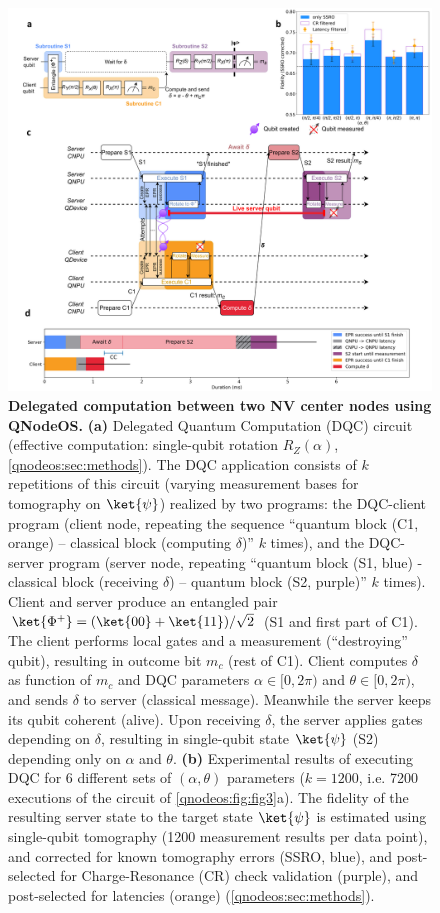 \begin{figure}[htbp]
\centering
\includegraphics[width=0.89\linewidth]{figures/qnodeos/main/fig3/fig3.png}
\caption{\textbf{Delegated computation between two NV center nodes using QNodeOS.} 
\textbf{(a)} Delegated Quantum Computation (DQC) circuit (effective computation: single-qubit rotation $R_Z (\alpha)$, \cref{qnodeos:sec:methods}). The DQC application consists of $k$ repetitions of this circuit (varying measurement bases for tomography on $\ket{\psi}$) realized by two programs: the DQC-client program (client node, repeating the sequence ``quantum block (C1, orange) – classical block (computing $\delta$)'' $k$ times), and the DQC-server program (server node, repeating ``quantum block (S1, blue) - classical block (receiving $\delta$) – quantum block (S2, purple)'' $k$ times). Client and server produce an entangled pair $\ket{\Phi^+} = (\ket{00} + \ket{11}) / \sqrt{2}$ (S1 and first part of C1). The client performs local gates and a measurement (``destroying'' qubit), resulting in outcome bit $m_c$ (rest of C1). Client computes $\delta$ as function of $m_c$ and DQC parameters $\alpha \in [0,2\pi)$ and $\theta \in [0, 2\pi)$, and sends $\delta$ to server (classical message). Meanwhile the server keeps its qubit coherent (alive). Upon receiving $\delta$, the server applies gates depending on $\delta$, resulting in single-qubit state $\ket{\psi}$ (S2) depending only on $\alpha$ and $\theta$.
\textbf{(b)} Experimental results of executing DQC for 6 different sets of $(\alpha, \theta)$ parameters ($k=1200$, i.e. 7200 executions of the circuit of \cref{qnodeos:fig:fig3}a). The fidelity of the resulting server state to the target state $\ket{\psi}$ is estimated using single-qubit tomography (1200 measurement results per data point), and corrected for known tomography errors (SSRO, blue), and post-selected for Charge-Resonance (CR) check validation (purple), and post-selected for latencies (orange) (\cref{qnodeos:sec:methods}).
}
\end{figure}
